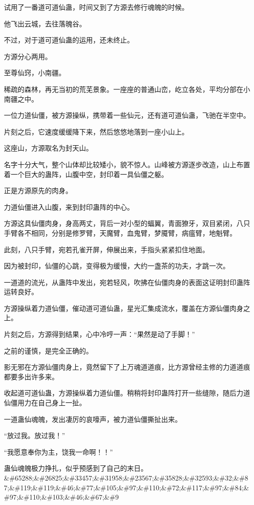 
\begin{this_body}

试用了一番道可道仙蛊，时间又到了方源去修行魂魄的时候。

他飞出云城，去往落魄谷。

不过，对于道可道仙蛊的运用，还未终止。

方源分心两用。

至尊仙窍，小南疆。

稀疏的森林，再无当初的荒芜景象。一座座的普通山峦，屹立各处，平均分部在小南疆之中。

一位力道仙僵，被方源操纵，携带着一些仙元，还有道可道仙蛊，飞驰在半空中。

片刻之后，它速度缓缓降下来，然后悠悠地落到一座小山上。

这座山，方源取名为封天山。

名字十分大气，整个山体却比较矮小，貌不惊人。山峰被方源逐步改造，山上布置着一个巨大的蛊阵，山腹中空，封印着一具仙僵之躯。

正是方源原先的肉身。

力道仙僵进入山腹，来到封印蛊阵的中心。

方源这具仙僵肉身，身高两丈，背后一对小型的蝠翼，青面獠牙，双目紧闭，八只手臂各不相同，分别是修罗臂，天魔臂，血鬼臂，梦魇臂，病瘟臂，地魁臂。

此刻，八只手臂，宛若孔雀开屏，伸展出来，手指头紧紧扣住地面。

因为被封印，仙僵的心跳，变得极为缓慢，大约一盏茶的功夫，才跳一次。

一道道的流光，从蛊阵中发出，宛若轻风，吹拂在仙僵肉身的表面这证明封印蛊阵运转良好。

方源操纵着力道仙僵，催动道可道仙蛊，星光汇集成流水，覆盖在方源仙僵肉身之上。

片刻之后，方源得到结果，心中冷哼一声：“果然是动了手脚！”

之前的谨慎，是完全正确的。

影无邪在方源仙僵肉身上，竟然留下了上万魂道道痕，比方源曾经主修的力道道痕都要多出许多来。

收起道可道仙蛊，方源操纵着力道仙僵。稍稍将封印蛊阵打开一些缝隙，随后力道仙僵用力在自己身上一扯。

一道蛊仙魂魄，发出凄厉的哀嚎声，被力道仙僵撕扯出来。

“放过我。放过我！”

“我愿意奉你为主，饶我一命啊！！”

蛊仙魂魄极力挣扎，似乎预感到了自己的末日。\&\#65288;\&\#26825;\&\#33457;\&\#31958;\&\#23567;\&\#35828;\&\#32593;\&\#32;\&\#87;\&\#119;\&\#119;\&\#46;\&\#77;\&\#105;\&\#97;\&\#110;\&\#72;\&\#117;\&\#97;\&\#84;\&\#97;\&\#110;\&\#103;\&\#46;\&\#67;\&\#9


\end{this_body}
